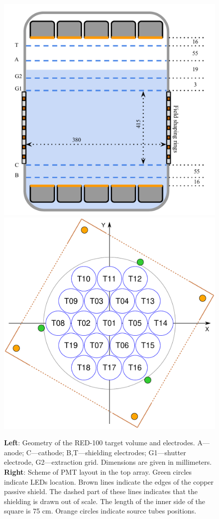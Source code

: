 \documentclass[a4paper,11pt]{article}
\begin{document}
\begin{figure}[htbp]
  \includegraphics[width=0.49\linewidth]{images/red100grids.pdf}
  \hfill
  \includegraphics[width=0.46\linewidth]{images/PMT_top_fancy.pdf}
  \caption{\textbf{Left}: Geometry of the RED-100 target volume and electrodes. A---anode; C---cathode; B,T---shielding electrodes; G1---shutter electrode, G2---extraction grid. Dimensions are given in millimeters. \\ \textbf{Right}: Scheme of PMT layout in the top array. Green circles indicate LEDs location. Brown lines indicate the edges of the copper passive shield. The dashed part of these lines indicates that the shielding is drawn out of scale. The length of the inner side of the square is 75 cm. Orange circles indicate source tubes positions.}
  \label{img:red100geometry}  
\end{figure} 
\end{document}
